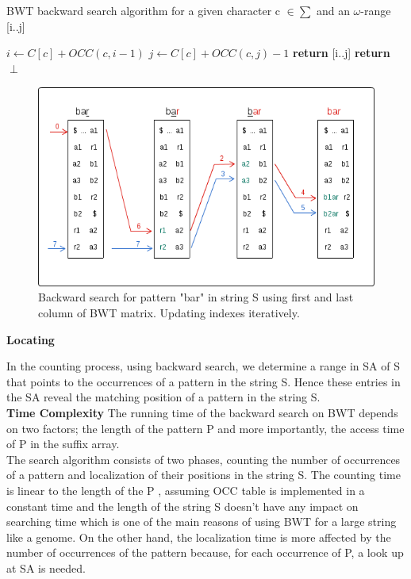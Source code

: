 \documentclass[11pt,a4paper]{report}
\begin{document}
\begin{algorithm}[H]
   \caption{BWT backward search algorithm for a 
   given character c $\in \sum $ and an 
   $\omega$-range [i..j]}
   
    \begin{algorithmic}[1]
       	\State ${i \leftarrow C[c] + OCC(c, i-1)}$
        \State ${j \leftarrow C[c] + OCC(c,j)-1}$
        		\State \textbf{return} [i..j]
        	\Else
        		\State \textbf{return} $\perp$
        	\EndIf 
    \EndFunction

	\end{algorithmic}
  \label{backward search alg}	
\end{algorithm}




\begin{figure}[H]
\centering
\includegraphics[width=12cm]{pictures/bar_2.png}
\caption{Backward search for pattern "bar" in 
string S using first and 
last column of BWT matrix. Updating indexes 
iteratively.}
\label{backwardSearch}
\end{figure}


\textbf{Locating} \label{Locating}

In the counting process, using backward search, we determine a range in SA of S
that points to the occurrences of a pattern in the string S. Hence these entries
in the SA reveal the matching position of a pattern in the string S.\\

\textbf{Time Complexity} 
The running time of the backward search on BWT depends on two factors; the length 
of the pattern P and more importantly, the access time of P in the suffix array.\\
The search algorithm consists of two phases, counting the number of occurrences 
of a pattern and localization of their positions in the string S. The counting time 
is linear to the length of the P , assuming OCC table is implemented in a constant
time and the length of the string S doesn't have any impact on searching time which 
is one of the main reasons of using BWT for a large string like a genome. On the 
other hand, the localization time is more affected by the number of occurrences of 
the pattern  because, for each occurrence of P, a look up at SA is needed.\\
\end{document}
